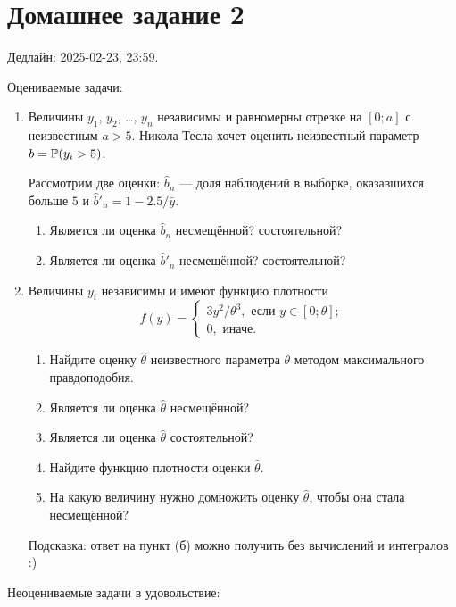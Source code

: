 \section*{Домашнее задание 2}

Дедлайн: 2025-02-23, 23:59.

Оцениваемые задачи:

\begin{enumerate}
    \item Величины $y_1$, $y_2$, \dots, $y_n$ независимы и равномерны отрезке на $[0; a]$ с неизвестным $a > 5$.
    Никола Тесла хочет оценить неизвестный параметр $b = \P(y_i > 5)$.

    Рассмотрим две оценки: $\hat b_n$ — доля наблюдений в выборке, оказавшихся больше $5$ и $\hat b'_n = 1 - 2.5/\bar y$.

    \begin{enumerate}
        \item Является ли оценка $\hat b_n$ несмещённой? состоятельной?
        \item Является ли оценка $\hat b'_n$ несмещённой? состоятельной?
    \end{enumerate}
    

\item Величины $y_i$ независимы и имеют функцию плотности
\[
f(y) = \begin{cases}
3y^2/\theta^3, \text{ если } y\in[0;\theta]; \\
0, \text{ иначе.}
\end{cases}
\]

\begin{enumerate}
\item Найдите оценку $\hat\theta$ неизвестного параметра $\theta$ методом максимального правдоподобия.
\item Является ли оценка $\hat\theta$ несмещённой? 
\item Является ли оценка $\hat\theta$ состоятельной?
\item Найдите функцию плотности оценки $\hat\theta$.
\item На какую величину нужно домножить оценку $\hat\theta$, чтобы она стала несмещённой?
\end{enumerate}

Подсказка: ответ на пункт (б) можно получить без вычислений и интегралов :)

\end{enumerate}

Неоцениваемые задачи в удовольствие:

